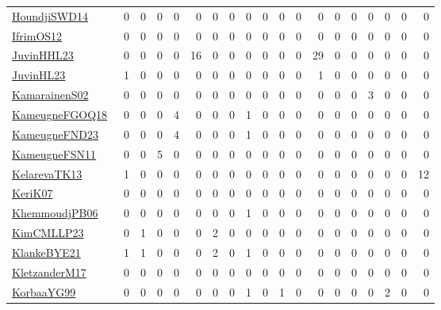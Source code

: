 {\begin{longtable}{l*{18}{r}}
\href{papers/HoundjiSWD14.pdf}{HoundjiSWD14}~\cite{HoundjiSWD14} & 0 & 0 & 0 & 0 & 0 & 0 & 0 & 0 & 0 & 0 & 0 & 0 & 0 & 0 & 0 & 0 & 0 & 0\\
\href{papers/IfrimOS12.pdf}{IfrimOS12}~\cite{IfrimOS12} & 0 & 0 & 0 & 0 & 0 & 0 & 0 & 0 & 0 & 0 & 0 & 0 & 0 & 0 & 0 & 0 & 0 & 0\\
\href{papers/JuvinHHL23.pdf}{JuvinHHL23}~\cite{JuvinHHL23} & 0 & 0 & 0 & 0 & 16 & 0 & 0 & 0 & 0 & 0 & 0 & 29 & 0 & 0 & 0 & 0 & 0 & 0\\
\href{papers/JuvinHL23.pdf}{JuvinHL23}~\cite{JuvinHL23} & 1 & 0 & 0 & 0 & 0 & 0 & 0 & 0 & 0 & 0 & 0 & 1 & 0 & 0 & 0 & 0 & 0 & 0\\
\href{papers/KamarainenS02.pdf}{KamarainenS02}~\cite{KamarainenS02} & 0 & 0 & 0 & 0 & 0 & 0 & 0 & 0 & 0 & 0 & 0 & 0 & 0 & 0 & 3 & 0 & 0 & 0\\
\href{papers/KameugneFGOQ18.pdf}{KameugneFGOQ18}~\cite{KameugneFGOQ18} & 0 & 0 & 0 & 4 & 0 & 0 & 0 & 1 & 0 & 0 & 0 & 0 & 0 & 0 & 0 & 0 & 0 & 0\\
\href{papers/KameugneFND23.pdf}{KameugneFND23}~\cite{KameugneFND23} & 0 & 0 & 0 & 4 & 0 & 0 & 0 & 1 & 0 & 0 & 0 & 0 & 0 & 0 & 0 & 0 & 0 & 0\\
\href{papers/KameugneFSN11.pdf}{KameugneFSN11}~\cite{KameugneFSN11} & 0 & 0 & 5 & 0 & 0 & 0 & 0 & 0 & 0 & 0 & 0 & 0 & 0 & 0 & 0 & 0 & 0 & 0\\
\href{papers/KelarevaTK13.pdf}{KelarevaTK13}~\cite{KelarevaTK13} & 1 & 0 & 0 & 0 & 0 & 0 & 0 & 0 & 0 & 0 & 0 & 0 & 0 & 0 & 0 & 0 & 0 & 12\\
\href{papers/KeriK07.pdf}{KeriK07}~\cite{KeriK07} & 0 & 0 & 0 & 0 & 0 & 0 & 0 & 0 & 0 & 0 & 0 & 0 & 0 & 0 & 0 & 0 & 0 & 0\\
\href{papers/KhemmoudjPB06.pdf}{KhemmoudjPB06}~\cite{KhemmoudjPB06} & 0 & 0 & 0 & 0 & 0 & 0 & 0 & 1 & 0 & 0 & 0 & 0 & 0 & 0 & 0 & 0 & 0 & 0\\
\href{papers/KimCMLLP23.pdf}{KimCMLLP23}~\cite{KimCMLLP23} & 0 & 1 & 0 & 0 & 0 & 2 & 0 & 0 & 0 & 0 & 0 & 0 & 0 & 0 & 0 & 0 & 0 & 0\\
\href{papers/KlankeBYE21.pdf}{KlankeBYE21}~\cite{KlankeBYE21} & 1 & 1 & 0 & 0 & 0 & 2 & 0 & 1 & 0 & 0 & 0 & 0 & 0 & 0 & 0 & 0 & 0 & 0\\
\href{papers/KletzanderM17.pdf}{KletzanderM17}~\cite{KletzanderM17} & 0 & 0 & 0 & 0 & 0 & 0 & 0 & 0 & 0 & 0 & 0 & 0 & 0 & 0 & 0 & 0 & 0 & 0\\
\href{papers/KorbaaYG99.pdf}{KorbaaYG99}~\cite{KorbaaYG99} & 0 & 0 & 0 & 0 & 0 & 0 & 0 & 1 & 0 & 1 & 0 & 0 & 0 & 0 & 0 & 2 & 0 & 0\\

\end{longtable}}

